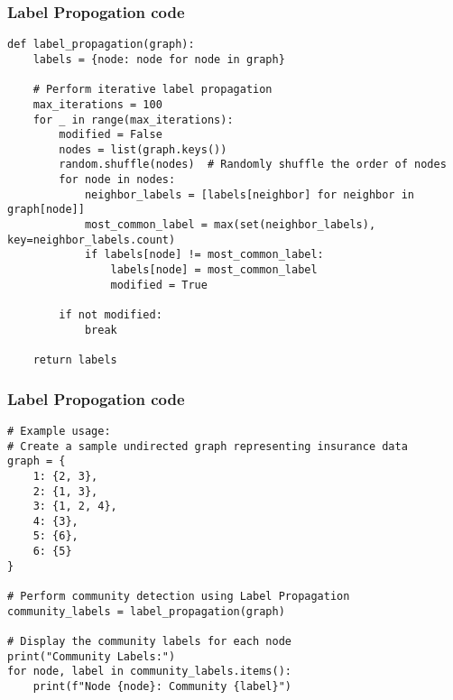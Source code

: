 \begin{frame}[fragile]\frametitle{Label Propogation code}

\begin{lstlisting}[basicstyle=\tiny]
def label_propagation(graph):
    labels = {node: node for node in graph}

    # Perform iterative label propagation
    max_iterations = 100
    for _ in range(max_iterations):
        modified = False
        nodes = list(graph.keys())
        random.shuffle(nodes)  # Randomly shuffle the order of nodes
        for node in nodes:
            neighbor_labels = [labels[neighbor] for neighbor in graph[node]]
            most_common_label = max(set(neighbor_labels), key=neighbor_labels.count)
            if labels[node] != most_common_label:
                labels[node] = most_common_label
                modified = True

        if not modified:
            break

    return labels
\end{lstlisting}

\end{frame}



\begin{frame}[fragile]\frametitle{Label Propogation code}

\begin{lstlisting}[basicstyle=\tiny]
# Example usage:
# Create a sample undirected graph representing insurance data
graph = {
    1: {2, 3},
    2: {1, 3},
    3: {1, 2, 4},
    4: {3},
    5: {6},
    6: {5}
}

# Perform community detection using Label Propagation
community_labels = label_propagation(graph)

# Display the community labels for each node
print("Community Labels:")
for node, label in community_labels.items():
    print(f"Node {node}: Community {label}")

\end{lstlisting}

\end{frame}

